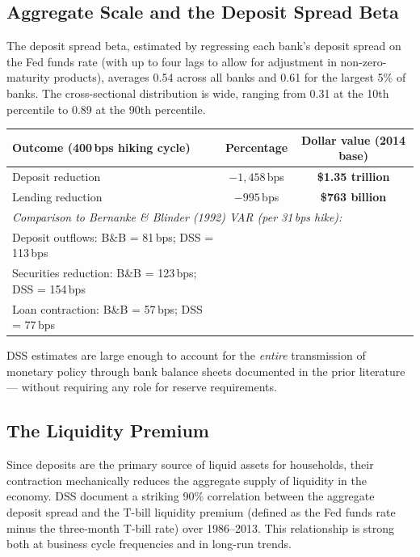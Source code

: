 \documentclass[12pt,a4paper]{article}
\begin{document}
\subsection{Aggregate Scale and the Deposit Spread Beta}

The deposit spread beta, estimated by regressing each bank's deposit spread on
the Fed funds rate (with up to four lags to allow for adjustment in
non-zero-maturity products), averages 0.54 across all banks and 0.61 for the
largest 5\% of banks. The cross-sectional distribution is wide, ranging from
0.31 at the 10th percentile to 0.89 at the 90th percentile.

\begin{keybox}
\small
\begin{center}
\begin{tabular}{p{6.6cm}cc}
\toprule
\textbf{Outcome (400\,bps hiking cycle)} & \textbf{Percentage} &
  \textbf{Dollar value (2014 base)} \\
\midrule
Deposit reduction & $-1{,}458$\,bps & \textbf{\$1.35 trillion} \\
Lending reduction & $-995$\,bps & \textbf{\$763 billion} \\
\midrule
\multicolumn{3}{p{10.6cm}}{\textit{Comparison to Bernanke \& Blinder (1992)
VAR (per 31\,bps hike):}} \\
Deposit outflows: B\&B = 81\,bps; DSS = 113\,bps & & \\
Securities reduction: B\&B = 123\,bps; DSS = 154\,bps & & \\
Loan contraction: B\&B = 57\,bps; DSS = 77\,bps & & \\
\bottomrule
\end{tabular}
\end{center}
\smallskip
DSS estimates are large enough to account for the \emph{entire} transmission
of monetary policy through bank balance sheets documented in the prior
literature --- without requiring any role for reserve requirements.
\end{keybox}

\subsection{The Liquidity Premium}

Since deposits are the primary source of liquid assets for households, their
contraction mechanically reduces the aggregate supply of liquidity in the
economy. DSS document a striking 90\% correlation between the aggregate deposit
spread and the T-bill liquidity premium (defined as the Fed funds rate minus
the three-month T-bill rate) over 1986--2013. This relationship is strong both
at business cycle frequencies and in long-run trends.
\end{document}
